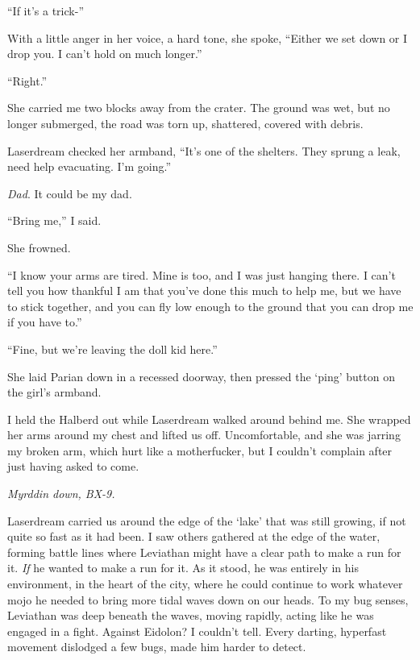 ``If it's a trick-''



With a little anger in her voice, a hard tone, she spoke, ``Either we set down or I drop you.  I can't hold on much longer.''



``Right.''



She carried me two blocks away from the crater.  The ground was wet, but no longer submerged, the road was torn up, shattered, covered with debris.



Laserdream checked her armband, ``It's one of the shelters.  They sprung a leak, need help evacuating.  I'm going.''



\emph{Dad}.  It could be my dad.



``Bring me,'' I said.



She frowned.



``I know your arms are tired.  Mine is too, and I was just hanging there.  I can't tell you how thankful I am that you've done this much to help me, but we have to stick together, and you can fly low enough to the ground that you can drop me if you have to.''



``Fine, but we're leaving the doll kid here.''



She laid Parian down in a recessed doorway, then pressed the `ping' button on the girl's armband.



I held the Halberd out while Laserdream walked around behind me.  She wrapped her arms around my chest and lifted us off.  Uncomfortable, and she was jarring my broken arm, which hurt like a motherfucker, but I couldn't complain after just having asked to come.



\emph{Myrddin down, BX-9}\emph{.}



Laserdream carried us around the edge of the `lake' that was still growing, if not quite so fast as it had been.  I saw others gathered at the edge of the water, forming battle lines where Leviathan might have a clear path to make a run for it. \emph{If} he wanted to make a run for it.  As it stood, he was entirely in his environment, in the heart of the city, where he could continue to work whatever mojo he needed to bring more tidal waves down on our heads.  To my bug senses, Leviathan was deep beneath the waves, moving rapidly, acting like he was engaged in a fight.  Against Eidolon?  I couldn't tell.  Every darting, hyperfast movement dislodged a few bugs, made him harder to detect.



